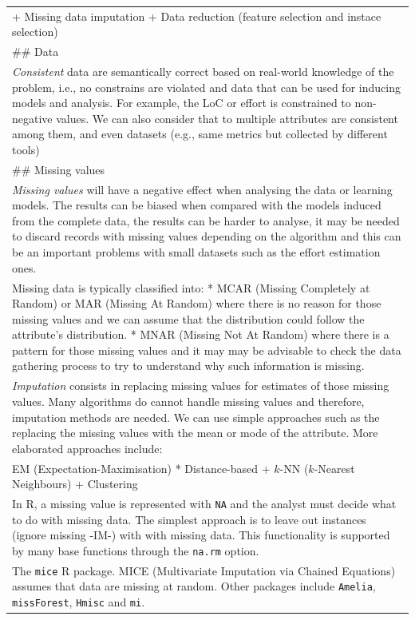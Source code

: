 \documentclass[
]{book}
\begin{document}
\begin{longtable}[]{@{}
  >{\raggedleft\arraybackslash}p{}@{}}
+ Missing data imputation
+ Data reduction (feature selection and instace selection) \\
\#\# Data \\
\emph{Consistent} data are semantically correct based on real-world knowledge of the problem, i.e., no constrains are violated and data that can be used for inducing models and analysis. For example, the LoC or effort is constrained to non-negative values. We can also consider that to multiple attributes are consistent among them, and even datasets (e.g., same metrics but collected by different tools) \\
\#\# Missing values \\
\emph{Missing values} will have a negative effect when analysing the data or learning models. The results can be biased when compared with the models induced from the complete data, the results can be harder to analyse, it may be needed to discard records with missing values depending on the algorithm and this can be an important problems with small datasets such as the effort estimation ones. \\
Missing data is typically classified into:
* MCAR (Missing Completely at Random) or MAR (Missing At Random) where there is no reason for those missing values and we can assume that the distribution could follow the attribute's distribution.
* MNAR (Missing Not At Random) where there is a pattern for those missing values and it may may be advisable to check the data gathering process to try to understand why such information is missing. \\
\emph{Imputation} consists in replacing missing values for estimates of those missing values. Many algorithms do cannot handle missing values and therefore, imputation methods are needed. We can use simple approaches such as the replacing the missing values with the mean or mode of the attribute. More elaborated approaches include: \\
* EM (Expectation-Maximisation)
* Distance-based
+ \(k\)-NN (\(k\)-Nearest Neighbours)
+ Clustering \\
In R, a missing value is represented with \texttt{NA} and the analyst must decide what to do with missing data. The simplest approach is to leave out instances (ignore missing -IM-) with with missing data. This functionality is supported by many base functions through the \texttt{na.rm} option. \\
The \texttt{mice} R package. MICE (Multivariate Imputation via Chained Equations) assumes that data are missing at random. Other packages include \texttt{Amelia}, \texttt{missForest}, \texttt{Hmisc} and \texttt{mi}. \\

\end{longtable}
\end{document}
